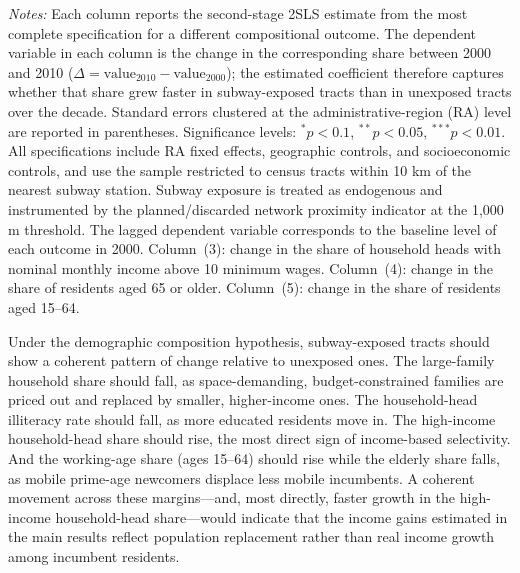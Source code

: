 \begin{table}[htbp]
\begin{tablenotes}
\item \textit{Notes:} Each column reports the second-stage 2SLS estimate from the most complete specification for a different compositional outcome. The dependent variable in each column is the change in the corresponding share between 2000 and 2010 ($\Delta = \text{value}_{2010} - \text{value}_{2000}$); the estimated coefficient therefore captures whether that share grew faster in subway-exposed tracts than in unexposed tracts over the decade. Standard errors clustered at the administrative-region (RA) level are reported in parentheses. Significance levels: $^{*}p<0.1$, $^{**}p<0.05$, $^{***}p<0.01$. All specifications include RA fixed effects, geographic controls, and socioeconomic controls, and use the sample restricted to census tracts within 10 km of the nearest subway station. Subway exposure is treated as endogenous and instrumented by the planned/discarded network proximity indicator at the 1,000 m threshold. The lagged dependent variable corresponds to the baseline level of each outcome in 2000. Column~(3): change in the share of household heads with nominal monthly income above 10 minimum wages. Column~(4): change in the share of residents aged 65 or older. Column~(5): change in the share of residents aged 15--64.
\end{tablenotes}
\end{table}

Under the demographic composition hypothesis, subway-exposed tracts should show a coherent pattern of change relative to unexposed ones. The large-family household share should fall, as space-demanding, budget-constrained families are priced out and replaced by smaller, higher-income ones. The household-head illiteracy rate should fall, as more educated residents move in. The high-income household-head share should rise, the most direct sign of income-based selectivity. And the working-age share (ages 15--64) should rise while the elderly share falls, as mobile prime-age newcomers displace less mobile incumbents. A coherent movement across these margins---and, most directly, faster growth in the high-income household-head share---would indicate that the income gains estimated in the main results reflect population replacement rather than real income growth among incumbent residents.

